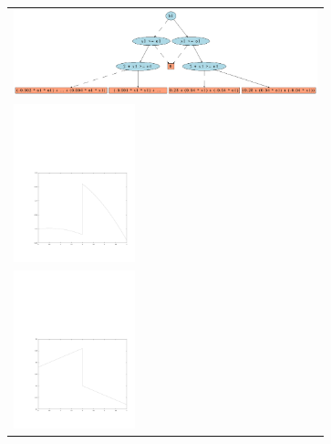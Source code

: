 \documentclass[10pt,a4paper]{article}
\begin{document}
{\centering
\begin{tabular}{l}
\includegraphics[width=250pt]{o1_x1b1.ps} \\
\includegraphics[width=100pt]{o1_b1false.pdf} \\
\includegraphics[width=100pt]{o1_b1true.pdf} \\
\end{tabular}
}
\end{document}
